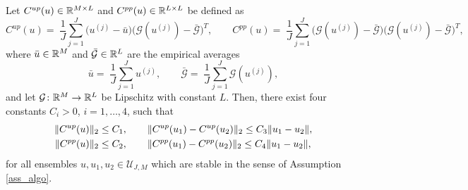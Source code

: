 \begin{lemma} \label{covariance_bound} Let $C^{up}(u) \in \mathbb{R}^{M\times L}$ and $C^{pp}(u) \in \mathbb{R}^{L \times L}$ be defined as
\begin{equation*}
	C^{up}(u) = \; \frac{1}{J} \sum_{j=1}^J \big(u^{(j)} - \bar{u}\big) \big(\mathcal{G}(u^{(j)}) - \bar{\mathcal{G}}\big)^T,  \qquad C^{pp}(u) = \; \frac{1}{J} \sum_{j=1}^J \big(\mathcal{G}(u^{(j)}) - \bar{\mathcal{G}}\big) \big(\mathcal{G}(u^{(j)}) - \bar{\mathcal{G}}\big)^T,
\end{equation*}
where $\bar u \in \mathbb{R}^M $ and $\bar{\mathcal G} \in \mathbb{R}^L$ are the empirical averages
\begin{equation*}
	\bar{u} = \; \frac{1}{J} \sum_{j=1}^J u^{(j)}, \qquad \bar{\mathcal{G}} = \; \frac{1}{J} \sum_{j=1}^J \mathcal{G}(u^{(j)}),
\end{equation*}
and let $\mathcal G \colon \mathbb{R}^M \to \mathbb{R}^L$ be Lipschitz with constant $L$. Then, there exist four constants $C_i > 0$, $i = 1, \ldots, 4$, such that
\begin{align*}
\lVert C^{up}(u)\rVert_2 &\le C_1, \qquad  \lVert C^{up}(u_1) - C^{up}(u_2)\rVert_2 \le C_3 \lVert u_1 - u_2\rVert,\\
\lVert C^{pp}(u)\rVert_2 &\le C_2, \qquad  \lVert C^{pp}(u_1) - C^{pp}(u_2)\rVert_2 \le C_4 \lVert u_1 - u_2\rVert,
\end{align*}
for all ensembles $u, u_1, u_2 \in \mathcal U_{J,M}$ which are stable in the sense of Assumption \ref{ass_algo}.
\end{lemma}

